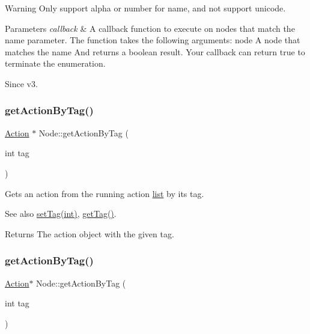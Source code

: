 \begin{DoxyWarning}{Warning}
Only support alpha or number for name, and not support unicode.
\end{DoxyWarning}

\begin{DoxyParams}{Parameters}
{\em callback} & A callback function to execute on nodes that match the {\ttfamily name} parameter. The function takes the following arguments\+: {\ttfamily node} A node that matches the name And returns a boolean result. Your callback can return {\ttfamily true} to terminate the enumeration.\\
\hline
\end{DoxyParams}
\begin{DoxySince}{Since}
v3. 
\end{DoxySince}
\mbox{\label{classNode_ad26f8b3ec382080393b96921e3a38ad8}} 
\subsubsection{\texorpdfstring{get\+Action\+By\+Tag()}{getActionByTag()}\hspace{0.1cm}{\footnotesize\ttfamily [1/2]}}
{\footnotesize\ttfamily \hyperlink{classAction}{Action} $\ast$ Node\+::get\+Action\+By\+Tag (\begin{DoxyParamCaption}\item[{int}]{tag }\end{DoxyParamCaption})}

Gets an action from the running action \hyperlink{protocollist-p}{list} by its tag.

\begin{DoxySeeAlso}{See also}
{\ttfamily \hyperlink{classNode_a41ecfc5e9e398e70dfe2e158f926c16f}{set\+Tag(int)}}, {\ttfamily \hyperlink{classNode_a9f18b6db8146f2660e8761bb9557d1fe}{get\+Tag()}}.
\end{DoxySeeAlso}
\begin{DoxyReturn}{Returns}
The action object with the given tag. 
\end{DoxyReturn}
\mbox{\label{classNode_aa4ada94036cba5f5e2bcc0437369fc4a}} 
\subsubsection{\texorpdfstring{get\+Action\+By\+Tag()}{getActionByTag()}\hspace{0.1cm}{\footnotesize\ttfamily [2/2]}}
{\footnotesize\ttfamily \hyperlink{classAction}{Action}$\ast$ Node\+::get\+Action\+By\+Tag (\begin{DoxyParamCaption}\item[{int}]{tag }\end{DoxyParamCaption})}

